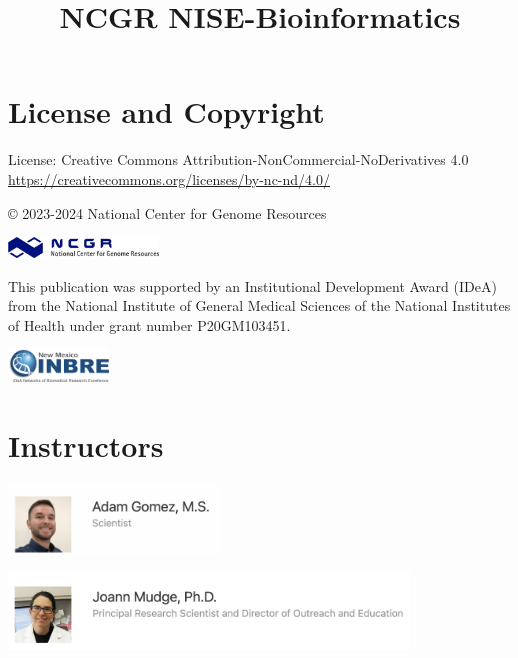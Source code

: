 \documentclass[
]{book}
\title{NCGR NISE-Bioinformatics}
\author{}
\date{\vspace{-2.5em}}
\begin{document}
\maketitle

{
\setcounter{tocdepth}{1}
\tableofcontents
}
\hypertarget{license-and-copyright}{%
\chapter*{License and Copyright}\label{license-and-copyright}}

License:
Creative Commons Attribution-NonCommercial-NoDerivatives 4.0
\url{https://creativecommons.org/licenses/by-nc-nd/4.0/}

© 2023-2024 National Center for Genome Resources

\includegraphics[width=0.3\textwidth,height=\textheight]{./Figures/ncgr.png}

This publication was supported by an Institutional Development Award (IDeA) from the National Institute of General Medical Sciences of the National Institutes of Health under grant number P20GM103451.

\includegraphics[width=0.2\textwidth,height=\textheight]{./Figures/INBRE_Logo_Grad_transparent-2019.png}

\hypertarget{instructors}{%
\chapter{Instructors}\label{instructors}}

\includegraphics[width=0.42\textwidth,height=\textheight]{./Figures/Adam.png}

\includegraphics[width=0.8\textwidth,height=\textheight]{./Figures/Joann.png}
\end{document}
